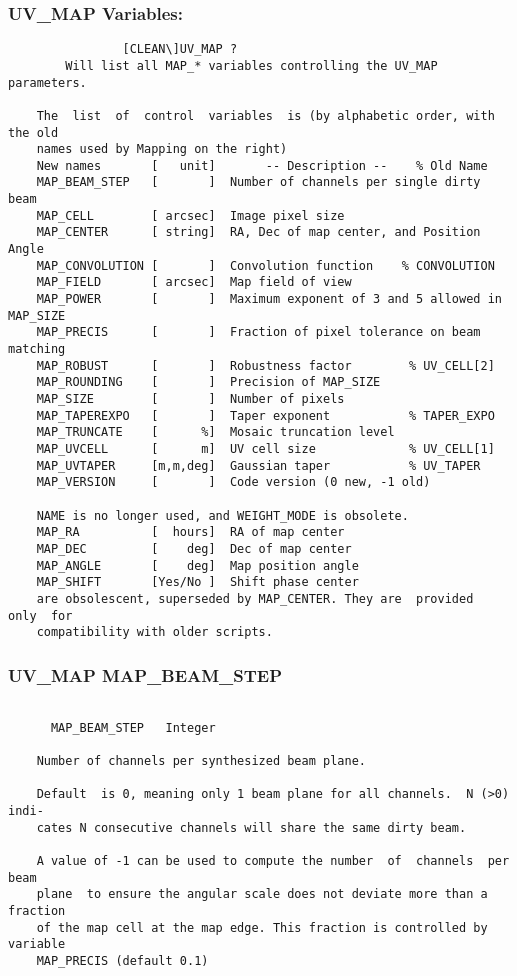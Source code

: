 \subsubsection{UV\_MAP Variables:}
\begin{verbatim}
                [CLEAN\]UV_MAP ?
        Will list all MAP_* variables controlling the UV_MAP parameters.

    The  list  of  control  variables  is (by alphabetic order, with the old
    names used by Mapping on the right)
    New names       [   unit]       -- Description --    % Old Name
    MAP_BEAM_STEP   [       ]  Number of channels per single dirty beam
    MAP_CELL        [ arcsec]  Image pixel size
    MAP_CENTER      [ string]  RA, Dec of map center, and Position Angle
    MAP_CONVOLUTION [       ]  Convolution function    % CONVOLUTION
    MAP_FIELD       [ arcsec]  Map field of view
    MAP_POWER       [       ]  Maximum exponent of 3 and 5 allowed in MAP_SIZE
    MAP_PRECIS      [       ]  Fraction of pixel tolerance on beam matching
    MAP_ROBUST      [       ]  Robustness factor        % UV_CELL[2]
    MAP_ROUNDING    [       ]  Precision of MAP_SIZE
    MAP_SIZE        [       ]  Number of pixels
    MAP_TAPEREXPO   [       ]  Taper exponent           % TAPER_EXPO
    MAP_TRUNCATE    [      %]  Mosaic truncation level
    MAP_UVCELL      [      m]  UV cell size             % UV_CELL[1]
    MAP_UVTAPER     [m,m,deg]  Gaussian taper           % UV_TAPER
    MAP_VERSION     [       ]  Code version (0 new, -1 old)

    NAME is no longer used, and WEIGHT_MODE is obsolete.
    MAP_RA          [  hours]  RA of map center
    MAP_DEC         [    deg]  Dec of map center
    MAP_ANGLE       [    deg]  Map position angle
    MAP_SHIFT       [Yes/No ]  Shift phase center
    are obsolescent, superseded by MAP_CENTER. They are  provided  only  for
    compatibility with older scripts.

\end{verbatim}
\subsubsection{UV\_MAP MAP\_BEAM\_STEP}
\begin{verbatim}

      MAP_BEAM_STEP   Integer

    Number of channels per synthesized beam plane.

    Default  is 0, meaning only 1 beam plane for all channels.  N (>0) indi-
    cates N consecutive channels will share the same dirty beam.

    A value of -1 can be used to compute the number  of  channels  per  beam
    plane  to ensure the angular scale does not deviate more than a fraction
    of the map cell at the map edge. This fraction is controlled by variable
    MAP_PRECIS (default 0.1)

\end{verbatim}
